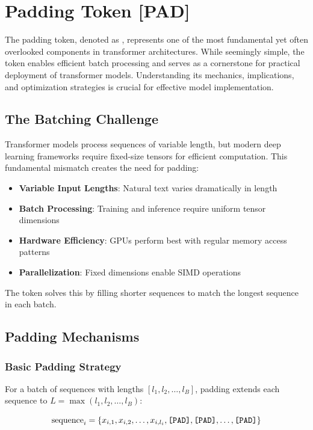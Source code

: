 \section{Padding Token [PAD]}

The padding token, denoted as \pad{}, represents one of the most fundamental yet often overlooked components in transformer architectures. While seemingly simple, the \pad{} token enables efficient batch processing and serves as a cornerstone for practical deployment of transformer models. Understanding its mechanics, implications, and optimization strategies is crucial for effective model implementation.

\subsection{The Batching Challenge}

Transformer models process sequences of variable length, but modern deep learning frameworks require fixed-size tensors for efficient computation. This fundamental mismatch creates the need for padding:

\begin{itemize}
\item \textbf{Variable Input Lengths}: Natural text varies dramatically in length
\item \textbf{Batch Processing}: Training and inference require uniform tensor dimensions
\item \textbf{Hardware Efficiency}: GPUs perform best with regular memory access patterns
\item \textbf{Parallelization}: Fixed dimensions enable SIMD operations
\end{itemize}

The \pad{} token solves this by filling shorter sequences to match the longest sequence in each batch.

\subsection{Padding Mechanisms}

\subsubsection{Basic Padding Strategy}
For a batch of sequences with lengths $[l_1, l_2, \ldots, l_B]$, padding extends each sequence to $L = \max(l_1, l_2, \ldots, l_B)$:

$$\text{sequence}_i = \{x_{i,1}, x_{i,2}, \ldots, x_{i,l_i}, \texttt{[PAD]}{}, \texttt{[PAD]}{}, \ldots, \texttt{[PAD]}{}\}$$

